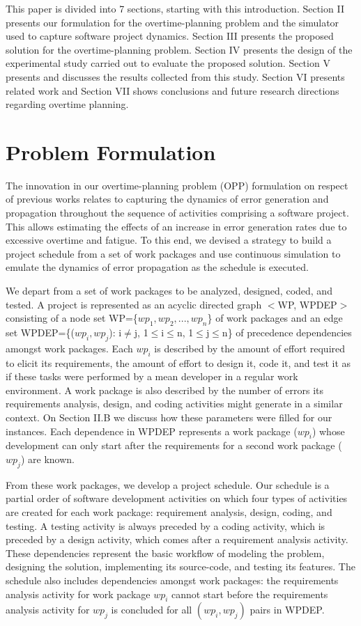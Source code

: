 \documentclass[conference]{IEEEtran}
\begin{document}
This paper is divided into 7 sections, starting with this introduction. Section II presents our formulation for the overtime-planning problem and the simulator used to capture software project dynamics. Section III presents the proposed solution for the overtime-planning problem. Section IV presents the design of the experimental study carried out to evaluate the proposed solution. Section V presents and discusses the results collected from this study. Section VI presents related work and Section VII shows conclusions and future research directions regarding overtime planning.

\section{Problem Formulation}
The innovation in our overtime-planning problem (OPP) formulation on respect of previous works relates to capturing the dynamics of error generation and propagation throughout the sequence of activities comprising a software project. This allows estimating the effects of an increase in error generation rates due to excessive overtime and fatigue. To this end, we devised a strategy to build a project schedule from a set of work packages and use continuous simulation to emulate the dynamics of error propagation as the schedule is executed.

We depart from a set of work packages to be analyzed, designed, coded, and tested. A project is represented as an acyclic directed graph $<$WP, WPDEP$>$ consisting of a node set WP=\{$wp_1, wp_2, ..., wp_n$\} of work packages and an edge set WPDEP=\{($wp_i, wp_j$): i$\not=$j, 1$\leq$i$\leq$n, 1$\leq$j$\leq$n\} of precedence dependencies amongst work packages. Each $wp_i$ is described by the amount of effort required to elicit its requirements, the amount of effort to design it, code it, and test it as if these tasks were performed by a mean developer in a regular work environment. A work package is also described by the number of errors its requirements analysis, design, and coding activities might generate in a similar context. On Section II.B we discuss how these parameters were filled for our instances. Each dependence in WPDEP represents a work package ($wp_i$) whose development can only start after the requirements for a second work package ($wp_j$) are known.

From these work packages, we develop a project schedule. Our schedule is a partial order of software development activities on which four types of activities are created for each work package: requirement analysis, design, coding, and testing. A testing activity is always preceded by a coding activity, which is preceded by a design activity, which comes after a requirement analysis activity. These dependencies represent the basic workflow of modeling the problem, designing the solution, implementing its source-code, and testing its features. The schedule also includes dependencies amongst work packages: the requirements analysis activity for work package $wp_i$ cannot start before the requirements analysis activity for $wp_j$ is concluded for all $(wp_i, wp_j)$ pairs in WPDEP. 
\end{document}
